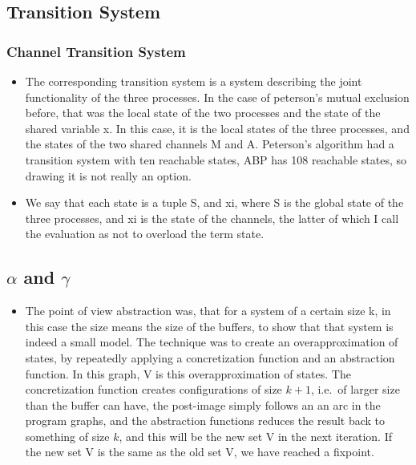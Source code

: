 \documentclass[handout]{beamer}
\begin{document}
\begin{footnotesize}
\subsection{Transition System}
\begin{frame}
  \frametitle{Channel Transition System}
  \begin{itemize}
  \item
The corresponding transition system is a system describing the joint functionality of the three processes. In the case of peterson's mutual exclusion before, that was the local state of the two processes and the state of the shared variable x. In this case, it is the local states of the three processes, and the states of the two shared channels M and A. Peterson's algorithm had a transition system with ten reachable states, ABP has 108 reachable states, so drawing it is not really an option.
\item
We say that each state is a tuple S, and xi, where S is the global state of the three processes, and xi is the state of the channels, the latter of which I call the evaluation as not to overload the term state.
  \end{itemize}
\end{frame}

\subsection{$\alpha$ and $\gamma$}
\begin{frame}
\begin{itemize}
\item
The point of view abstraction was, that for a system of a certain size k, in this case the size means the size of the buffers, to show that that system is indeed a small model. The technique was to create an overapproximation of states, by repeatedly applying a concretization function and an abstraction function. In this graph, V is this overapproximation of states. The concretization function creates configurations of size $k+1$, i.e.\ of larger size than the buffer can have, the post-image simply follows an an arc in the program graphs, and the abstraction functions reduces the result back to something of size $k$, and this will be the new set V in the next iteration. If the new set V is the same as the old set V, we have reached a fixpoint.
\end{itemize}
\end{frame}


\end{footnotesize}
\end{document}
